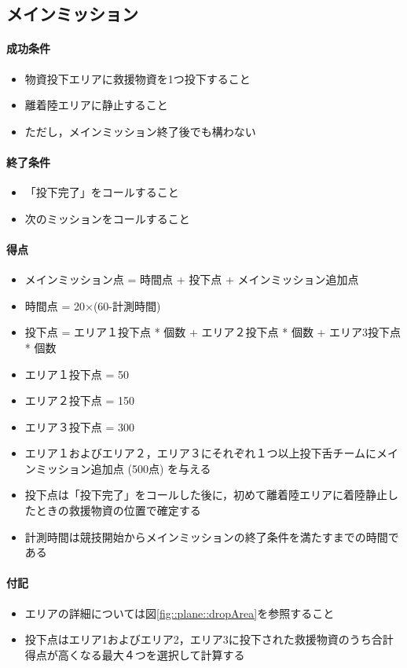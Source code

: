 
\subsection{メインミッション}
\paragraph{成功条件}
\begin{itemize}
\item 物資投下エリアに救援物資を1つ投下すること
\item 離着陸エリアに静止すること
  \item ただし，メインミッション終了後でも構わない
\end{itemize}
\paragraph{終了条件}
\begin{itemize}
\item 「投下完了」をコールすること
\item 次のミッションをコールすること
\end{itemize}
\paragraph{得点}
\begin{itemize}
\item メインミッション点 = 時間点 + 投下点 + メインミッション追加点
\item 時間点 = 20×(60-計測時間)
\item 投下点 = エリア１投下点 * 個数 + エリア２投下点 * 個数 + エリア3投下点 * 個数
\item エリア１投下点 = 50
\item エリア２投下点 = 150
\item エリア３投下点 = 300
\item エリア１およびエリア２，エリア３にそれぞれ１つ以上投下舌チームにメインミッション追加点 (500点) を与える
\item 投下点は「投下完了」をコールした後に，初めて離着陸エリアに着陸静止したときの救援物資の位置で確定する
\item 計測時間は競技開始からメインミッションの終了条件を満たすまでの時間である
\end{itemize}
\paragraph{付記}
\begin{itemize}
\item エリアの詳細については図\ref{fig::plane::dropArea}を参照すること
\item 投下点はエリア1およびエリア2，エリア3に投下された救援物資のうち合計得点が高くなる最大４つを選択して計算する
\end{itemize}

